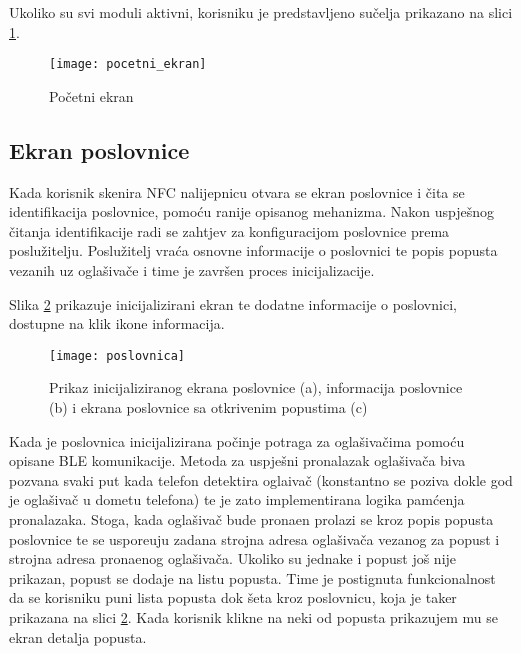 Ukoliko su svi moduli aktivni, korisniku je predstavljeno su\v{c}elja prikazano na slici \ref{fig:pocetniEkran}.


\begin{figure}[!htbp]
	\begin{center}
 \texttt{[image: pocetni\_ekran]}
 \caption{Po\v{c}etni ekran}
 \label{fig:pocetniEkran}
	\end{center}
\end{figure}


\subsection{Ekran poslovnice}

Kada korisnik skenira NFC nalijepnicu otvara se ekran poslovnice i \v{c}ita se identifikacija poslovnice, pomo\'{c}u ranije opisanog mehanizma. Nakon uspje\v{s}nog \v{c}itanja identifikacije radi se zahtjev za konfiguracijom poslovnice prema poslu\v{z}itelju. Poslu\v{z}itelj vra\'{c}a osnovne informacije o poslovnici te popis popusta vezanih uz ogla\v{s}iva\v{c}e i time je zavr\v{s}en proces inicijalizacije.

Slika \ref{fig:poslovnica} prikazuje inicijalizirani ekran te dodatne informacije o poslovnici, dostupne na klik ikone informacija.



\begin{figure}[!htbp]
	\begin{center}
 \texttt{[image: poslovnica]}
 \caption{Prikaz inicijaliziranog ekrana poslovnice (a), informacija poslovnice (b) i ekrana poslovnice sa otkrivenim popustima (c)}
 \label{fig:poslovnica}
	\end{center}
\end{figure}

Kada je poslovnica inicijalizirana po\v{c}inje potraga za ogla\v{s}iva\v{c}ima pomo\'{c}u opisane BLE komunikacije. Metoda za uspje\v{s}ni pronalazak ogla\v{s}iva\v{c}a biva pozvana svaki put kada telefon detektira oglaiva\v{c} (konstantno se poziva dokle god je ogla\v{s}iva\v{c} u dometu telefona) te je zato implementirana logika pam\'{c}enja pronalazaka. Stoga, kada ogla\v{s}iva\v{c} bude prona\dj en prolazi se kroz popis popusta poslovnice te se uspore\dj uju zadana strojna adresa ogla\v{s}iva\v{c}a vezanog za popust i strojna adresa prona\dj enog ogla\v{s}iva\v{c}a. Ukoliko su jednake i popust jo\v{s} nije prikazan, popust se dodaje na listu popusta. Time je postignuta funkcionalnost da se korisniku puni lista popusta dok \v{s}eta kroz poslovnicu, koja je tak\dj er prikazana na slici \ref{fig:poslovnica}. Kada korisnik klikne na neki od popusta prikazujem mu se ekran detalja popusta.



